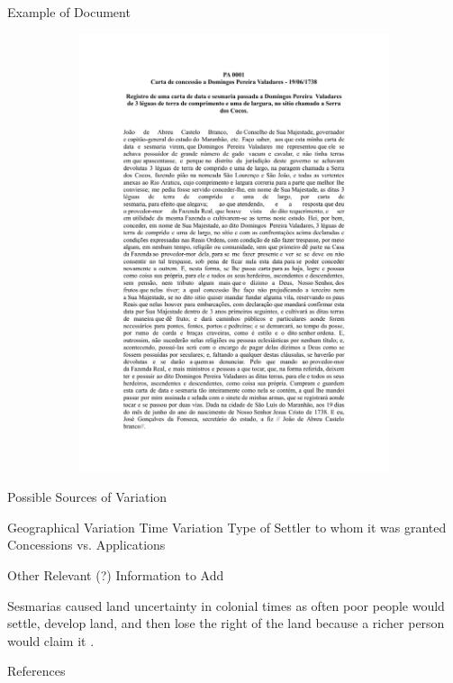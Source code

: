 \documentclass[aspectratio=1610]{beamer}
\begin{document}
\begin{frame}{Example of Document}
\begin{figure}
\begin{subfigure}[t]{0.4\textwidth}
        \includegraphics[page = 1, width = \textwidth]
        {Pictures/ea71ea6ac7c5ec3cefa24ded60ac6438.pdf}
        \end{subfigure}
    \end{figure}
\end{frame}


\begin{frame}{Possible Sources of Variation}
    \begin{outline}
        \1 Geographical Variation
        \1 Time Variation
        \1 Type of Settler to whom it was granted
        \1 Concessions vs. Applications
    \end{outline}
\end{frame}

\begin{frame}{Other Relevant (?) Information to Add}
    \begin{outline}
        \1 Sesmarias caused land uncertainty in colonial times as often poor people would settle, develop land, and then lose the right of the land because a richer person would claim it \parencite[p.~142]{Da_Costa_Porto1979-dz}.

    \end{outline}
\end{frame}

\begin{frame}[allowframebreaks, t]{References}
    \printbibliography
\end{frame}
\end{document}
